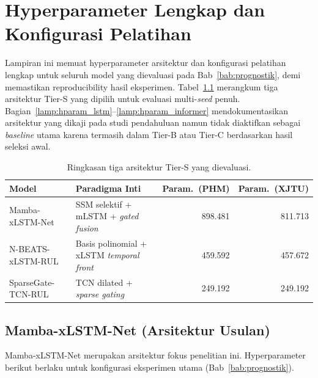 
\chapter{Hyperparameter Lengkap dan Konfigurasi Pelatihan}
\label{lamp:hparam}

Lampiran ini memuat hyperparameter arsitektur dan konfigurasi pelatihan
lengkap untuk seluruh model yang dievaluasi pada Bab~\ref{bab:prognostik},
demi memastikan reproducibility hasil eksperimen. Tabel~\ref{tab:lampB_tier_s}
merangkum tiga arsitektur Tier-S yang dipilih untuk evaluasi multi-\emph{seed}
penuh. Bagian~\ref{lamp:hparam_lstm}--\ref{lamp:hparam_informer} mendokumentasikan
arsitektur yang dikaji pada studi pendahuluan namun tidak diaktifkan sebagai
\emph{baseline} utama karena termasih dalam Tier-B atau Tier-C berdasarkan hasil
seleksi awal.

\begin{table}[ht]
  \centering
  \caption{Ringkasan tiga arsitektur Tier-S yang dievaluasi.}
  \label{tab:lampB_tier_s}
  \footnotesize
  \begin{tabularx}{\textwidth}{@{}l X r r@{}}
    \toprule
    \textbf{Model}      & \textbf{Paradigma Inti}                             & \textbf{Param.\ (PHM)} & \textbf{Param.\ (XJTU)} \\
    \midrule
    Mamba-xLSTM-Net     & SSM selektif + mLSTM + \emph{gated fusion}          & 898.481                & 811.713                 \\
    N-BEATS-xLSTM-RUL   & Basis polinomial + xLSTM \emph{temporal front}      & 459.592                & 457.672                 \\
    SparseGate-TCN-RUL  & TCN dilated + \emph{sparse gating}                  & 249.192                & 249.192                 \\
    \bottomrule
  \end{tabularx}
\end{table}

\section{Mamba-xLSTM-Net (Arsitektur Usulan)}
\label{lamp:hparam_proposed}

Mamba-xLSTM-Net merupakan arsitektur fokus penelitian ini. Hyperparameter
berikut berlaku untuk konfigurasi eksperimen utama (Bab~\ref{bab:prognostik}).

